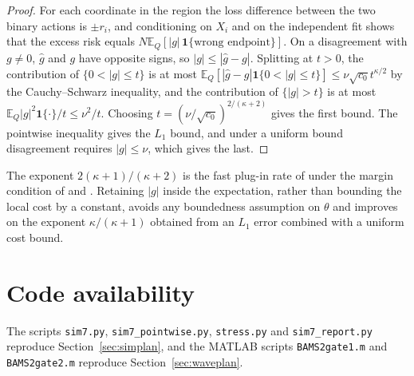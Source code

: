 \documentclass[11pt]{article}
\theoremstyle{plain}
\theoremstyle{definition}
\theoremstyle{remark}
\newcommand{\E}{\mathbb E}
\newcommand{\ind}{\mathbf 1}
\begin{document}
\begin{proof}
For each coordinate in the region the loss difference between the two binary actions is
$\pm r_i$, and conditioning on $X_i$ and on the independent fit shows that the excess risk
equals $N\E_Q[|g|\,\ind\{\text{wrong endpoint}\}]$. On a disagreement with $g\ne0$, $\widehat g$
and $g$ have opposite signs, so $|g|\le|\widehat g-g|$. Splitting at $t>0$, the contribution
of $\{0<|g|\le t\}$ is at most $\E_Q[|\widehat g-g|\ind\{0<|g|\le t\}]\le\nu\sqrt{c_0}
t^{\kappa/2}$ by the Cauchy--Schwarz inequality, and the contribution of $\{|g|>t\}$ is at
most $\E_Q|g|^2\ind\{\cdot\}/t\le\nu^2/t$. Choosing $t=(\nu/\sqrt{c_0})^{2/(\kappa+2)}$ gives the first bound. The pointwise inequality gives the $L_1$ bound, and
under a uniform bound disagreement requires $|g|\le\nu$, which gives the last.
\end{proof}

The exponent $2(\kappa+1)/(\kappa+2)$ is the fast plug-in rate of
\citet{audibert2007fast} under the margin condition of \citet{mammen1999smooth} and
\citet{tsybakov2004optimal}. Retaining $|g|$ inside the expectation, rather than bounding the
local cost by a constant, avoids any boundedness assumption on $\theta$ and improves on the
exponent $\kappa/(\kappa+1)$ obtained from an $L_1$ error combined with a uniform cost bound.

\section*{Code availability}
The scripts \texttt{sim7.py}, \texttt{sim7\_pointwise.py}, \texttt{stress.py} and
\texttt{sim7\_report.py} reproduce Section~\ref{sec:simplan}, and the MATLAB scripts \texttt{BAMS2gate1.m} and \texttt{BAMS2gate2.m} reproduce
Section~\ref{sec:waveplan}.



\end{document}
